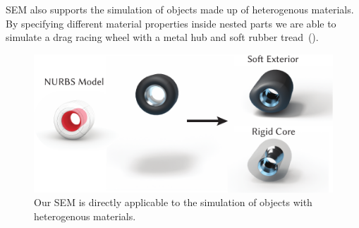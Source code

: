 SEM also supports the simulation of objects made up of heterogenous materials. By specifying different material properties inside nested 
parts we are able to simulate a drag racing wheel with a metal hub and soft rubber tread~().

\begin{figure}[h]
  \includegraphics[width=\columnwidth]{figures/tire}
  \caption{Our SEM is directly applicable to the simulation of objects with heterogenous materials.}
  \label{fig:tire}
\end{figure}




